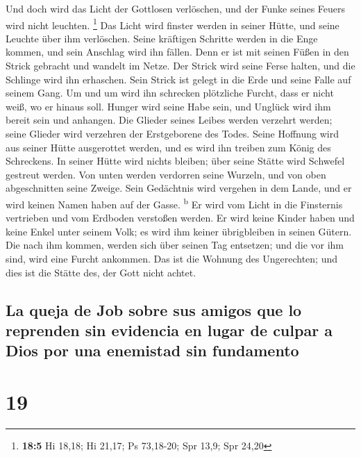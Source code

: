  Und doch wird das Licht der Gottlosen verlöschen, und der
Funke seines Feuers wird nicht leuchten. \footnote{\textbf{18:5} Hi
  18,18; Hi 21,17; Ps 73,18-20; Spr 13,9; Spr 24,20}  Das
Licht wird finster werden in seiner Hütte, und seine Leuchte über ihm
verlöschen.  Seine kräftigen Schritte werden in die Enge
kommen, und sein Anschlag wird ihn fällen.  Denn er ist
mit seinen Füßen in den Strick gebracht und wandelt im Netze.
 Der Strick wird seine Ferse halten, und die Schlinge wird
ihn erhaschen.  Sein Strick ist gelegt in die Erde und
seine Falle auf seinem Gang.  Um und um wird ihn
schrecken plötzliche Furcht, dass er nicht weiß, wo er hinaus soll.
 Hunger wird seine Habe sein, und Unglück wird ihm bereit
sein und anhangen.  Die Glieder seines Leibes werden
verzehrt werden; seine Glieder wird verzehren der Erstgeborene des
Todes.  Seine Hoffnung wird aus seiner Hütte ausgerottet
werden, und es wird ihn treiben zum König des Schreckens.
 In seiner Hütte wird nichts bleiben; über seine Stätte
wird Schwefel gestreut werden.  Von unten werden
verdorren seine Wurzeln, und von oben abgeschnitten seine Zweige.
 Sein Gedächtnis wird vergehen in dem Lande, und er wird
keinen Namen haben auf der Gasse. \textsuperscript{b}  Er
wird vom Licht in die Finsternis vertrieben und vom Erdboden verstoßen
werden.  Er wird keine Kinder haben und keine Enkel unter
seinem Volk; es wird ihm keiner übrigbleiben in seinen Gütern.
 Die nach ihm kommen, werden sich über seinen Tag
entsetzen; und die vor ihm sind, wird eine Furcht ankommen.
 Das ist die Wohnung des Ungerechten; und dies ist die
Stätte des, der Gott nicht achtet.

\hypertarget{la-queja-de-job-sobre-sus-amigos-que-lo-reprenden-sin-evidencia-en-lugar-de-culpar-a-dios-por-una-enemistad-sin-fundamento}{%
\subsection{La queja de Job sobre sus amigos que lo reprenden sin
evidencia en lugar de culpar a Dios por una enemistad sin
fundamento}\label{la-queja-de-job-sobre-sus-amigos-que-lo-reprenden-sin-evidencia-en-lugar-de-culpar-a-dios-por-una-enemistad-sin-fundamento}}

\hypertarget{section-18}{%
\section{19}\label{section-18}}


